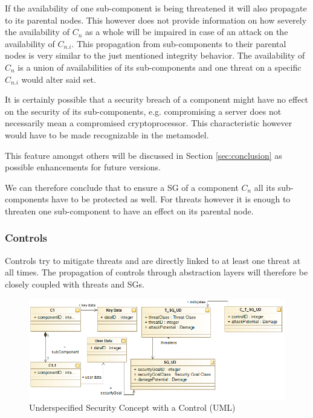If the availability of one sub-component is being threatened it will also propagate to its parental nodes. This however does not provide information on how severely the availability of $C_n$ as a whole will be impaired in case of an attack on the availability of $C_{n.i}$. This propagation from sub-components to their parental nodes is very similar to the just mentioned integrity behavior. The availability of $C_n$ is a union of availabilities of its sub-components and one threat on a specific $C_{n.i}$ would alter said set.

It is certainly possible that a security breach of a component might have no effect on the security of its sub-components, e.g. compromising a server does not necessarily mean a compromised cryptoprocessor. This characteristic however would have to be made recognizable in the metamodel. 

This feature amongst others will be discussed in Section \ref{sec:conclusion} as possible enhancements for future versions. 

We can therefore conclude that to ensure a SG of a component $C_n$ all its sub-components have to be protected as well. For threats however it is enough to threaten one sub-component to have an effect on its parental node.

\subsubsection*{Controls}

Controls try to mitigate threats and are directly linked to at least one threat at all times. The propagation of controls through abstraction layers will therefore be closely coupled with threats and SGs.

\begin{figure}[H]
\centering
\includegraphics[width=\textwidth]{pictures/control_propagation.png}
\caption{Underspecified Security Concept with a Control (UML)}
\label{fig:control_propagation}
\end{figure} 

